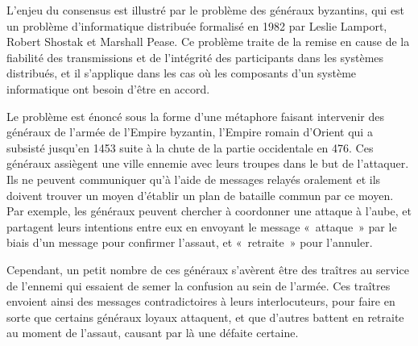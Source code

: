 
L'enjeu du consensus est illustré par le problème des généraux byzantins, qui est un problème d'informatique distribuée formalisé en 1982 par Leslie Lamport, Robert Shostak et Marshall Pease. Ce problème traite de la remise en cause de la fiabilité des transmissions et de l'intégrité des participants dans les systèmes distribués, et il s'applique dans les cas où les composants d'un système informatique ont besoin d'être en accord.

Le problème est énoncé sous la forme d'une métaphore faisant intervenir des généraux de l'armée de l'Empire byzantin, l'Empire romain d'Orient qui a subsisté jusqu'en 1453 suite à la chute de la partie occidentale en 476. Ces généraux assiègent une ville ennemie avec leurs troupes dans le but de l'attaquer. Ils ne peuvent communiquer qu'à l'aide de messages relayés oralement et ils doivent trouver un moyen d'établir un plan de bataille commun par ce moyen. Par exemple, les généraux peuvent chercher à coordonner une attaque à l'aube, et partagent leurs intentions entre eux en envoyant le message «~attaque~» par le biais d'un message pour confirmer l'assaut, et «~retraite~» pour l'annuler. %


Cependant, un petit nombre de ces généraux s'avèrent être des traîtres au service de l'ennemi qui essaient de semer la confusion au sein de l'armée. Ces traîtres envoient ainsi des messages contradictoires à leurs interlocuteurs, pour faire en sorte que certains généraux loyaux attaquent, et que d'autres battent en retraite au moment de l'assaut, causant par là une défaite certaine.

